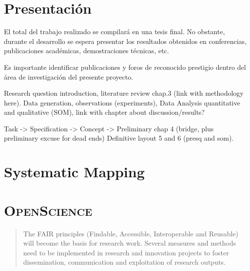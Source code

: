 \section{Presentación}
El total del trabajo realizado se compilará en una tesis final. No obstante,
durante el desarrollo se espera presentar los resultados obtenidos en
conferencias, publicaciones académicas, demostraciones técnicas, etc.

Es importante identificar publicaciones y foros de reconocido prestigio dentro
del área de investigación del presente proyecto.


Research question introduction, literature review chap.3 (link with methodology here).
Data generation, observations (experiments), Data Analysis quantitative and qualitative (SOM),
link with chapter about discussion/results?

Task -> Specification -> Concept -> Preliminary chap 4 (bridge, plus preliminary excuse for dead ends)
Definitive layout 5 and 6 (presq and som).

\section{Systematic Mapping}

\section{\textsc{OpenScience}}

\begin{quote}
    The FAIR principles (Findable, Accessible, Interoperable and Reusable) will become the basis for research work. Several measures and methods need to be implemented in research and innovation projects to foster dissemination, communication and exploitation of research outputs. 
\end{quote}

